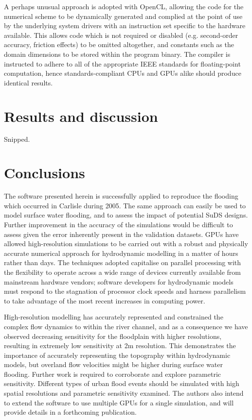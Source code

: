 A perhaps unusual approach is adopted with OpenCL, allowing the code for the numerical scheme to be dynamically generated and complied at the point of use by the underlying system drivers with an instruction set specific to the hardware available. This allows code which is not required or disabled (e.g. second-order accuracy, friction effects) to be omitted altogether, and constants such as the domain dimensions to be stored within the program binary. The compiler is instructed to adhere to all of the appropriate IEEE standards for floating-point computation, hence standards-compliant CPUs and GPUs alike should produce identical results.

\section{Results and discussion}

Snipped.

\section{Conclusions}

The software presented herein is successfully applied to reproduce the flooding which occurred in Carlisle during 2005. The same approach can easily be used to model surface water flooding, and to assess the impact of potential SuDS designs. Further improvement in the accuracy of the simulations would be difficult to assess given the error inherently present in the validation datasets. GPUs have allowed high-resolution simulations to be carried out with a robust and physically accurate numerical approach for hydrodynamic modelling in a matter of hours rather than days. The techniques adopted capitalise on parallel processing with the flexibility to operate across a wide range of devices currently available from mainstream hardware vendors; software developers for hydrodynamic models must respond to the stagnation of processor clock speeds and harness parallelism to take advantage of the most recent increases in computing power. 

High-resolution modelling has accurately represented and constrained the complex flow dynamics to within the river channel, and as a consequence we have observed decreasing sensitivity for the floodplain with higher resolutions, resulting in extremely low sensitivity at 2m resolution. This demonstrates the importance of accurately representing the topography within hydrodynamic models, but overland flow velocities might be higher during surface water flooding. Further work is required to corroborate and explore parametric sensitivity. Different types of urban flood events should be simulated with high spatial resolutions and parametric sensitivity examined. The authors also intend to extend the software to use multiple GPUs for a single simulation, and will provide details in a forthcoming publication.

